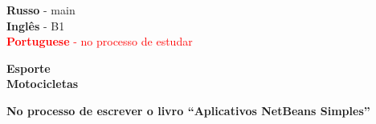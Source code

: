 

\begin{minipage}[t]{0.3\textwidth}
    \vspace{-\baselineskip} %


    \textbf{Russo} - main\\
    \textbf{Inglês} - B1\\
    \textcolor{red}{\textbf{Portuguese} - no processo de estudar}
\end{minipage}
\hfill
\begin{minipage}[t]{0.3\textwidth}
    \vspace{-\baselineskip} %


    \textbf{Esporte} \\
    \textbf{Motocicletas}

\end{minipage}
\hfill
\begin{minipage}[t]{0.3\textwidth}
    \vspace{-\baselineskip} %


    \textbf{No processo de escrever o livro \enquote{Aplicativos NetBeans Simples}}
\end{minipage}

